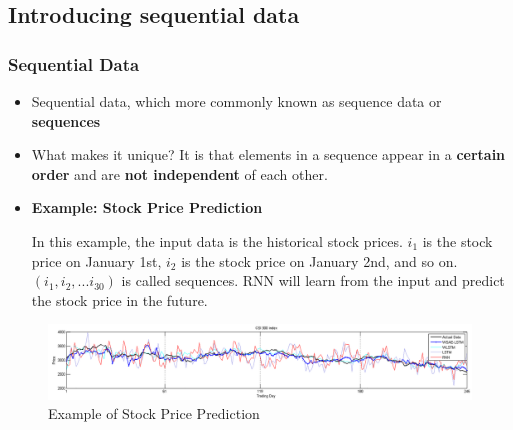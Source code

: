 \documentclass[11pt,]{beamer}
\begin{document}
\subsection{Introducing sequential data}
\begin{frame}
	\frametitle{Sequential Data}
	\begin{itemize}
		\item Sequential data, which more commonly known as sequence data or \textbf{sequences}
	\bigskip
		\item What makes it unique? It is that elements in a sequence appear in a \textbf{certain order} and are \textbf{not independent} of each other. 
	\bigskip
        \item \textbf{Example: Stock Price Prediction}
        
        In this example, the input data is the historical stock prices. \(i_1\) is the stock price on January 1st, \(i_2\) is the stock price on January 2nd, and so on. \((i_1, i_2, ... i_{30})\) is called sequences. RNN will learn from the input and predict the stock price in the future.
        \end{itemize}
        \begin{figure}
            \centering
            \includegraphics[scale=0.6]{Images/stock.png}
            \caption{Example of Stock Price Prediction}
            \label{fig:enter-label}
        \end{figure}
\end{frame}
\end{document}
